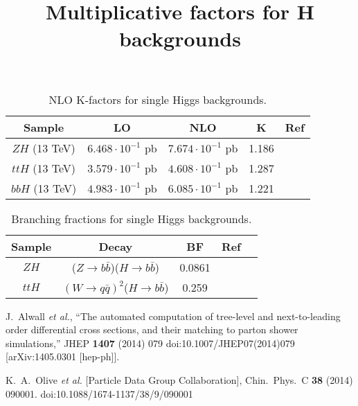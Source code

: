\documentclass[11pt]{article}
\title{Multiplicative factors for H backgrounds}
\begin{document}
\maketitle


\begin{table}[htp]
\begin{center}
\begin{tabular}{|c|c|c|c|c|}
\hline
Sample & LO & NLO & K & Ref\\
\hline\hline
$ZH$ (13 TeV) & $6.468 \cdot 10^{-1}$ pb & $ 7.674 \cdot 10^{-1}$ pb & 1.186 & \cite{Alwall:2014hca}\\
$ttH$ (13 TeV) & $3.579 \cdot 10^{-1}$ pb & $4.608 \cdot 10^{-1}$ pb & 1.287 &  \cite{Alwall:2014hca}\\
$bbH$ (13 TeV) &  $4.983 \cdot 10^{-1}$ pb & $6.085 \cdot 10^{-1}$ pb & 1.221 & \cite{Alwall:2014hca}\\
\hline
\end{tabular}
\end{center}
\label{HK}
\caption{NLO K-factors for single Higgs backgrounds.}
\end{table}%

\begin{table}[htp]
\begin{center}
\begin{tabular}{|c|c|c|c|c|}
\hline
Sample & Decay & BF & Ref\\
\hline\hline
$ZH$ & ($Z\to b\bar{b}$)($H\to b\bar{b}$) & 0.0861 & \cite{Agashe:2014kda}\\
$ttH$ & $(W\to q\bar{q})^2$($H\to b\bar{b}$) & 0.259 & \cite{Agashe:2014kda}\\
\hline
\end{tabular}
\end{center}
\label{HBF}
\caption{Branching fractions for single Higgs backgrounds.}
\end{table}%
\begin{thebibliography}{9}

  J.~Alwall {\it et al.},
  ``The automated computation of tree-level and next-to-leading order differential cross sections, and their matching to parton shower simulations,''
  JHEP {\bf 1407} (2014) 079
  doi:10.1007/JHEP07(2014)079
  [arXiv:1405.0301 [hep-ph]].
  
  K.~A.~Olive {\it et al.} [Particle Data Group Collaboration],
  Chin.\ Phys.\ C {\bf 38} (2014) 090001.
  doi:10.1088/1674-1137/38/9/090001
  
\end{thebibliography}


\end{document}
